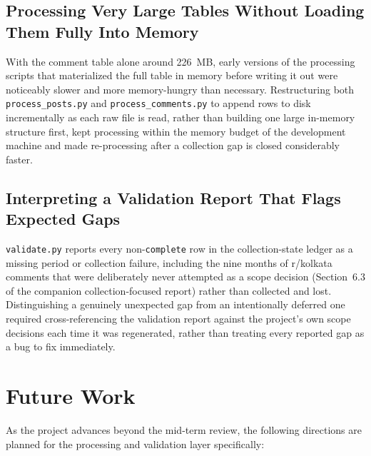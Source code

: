 \documentclass[12pt]{article}
\begin{document}
\subsection{Processing Very Large Tables Without Loading Them Fully Into Memory}
With the comment table alone around 226~MB, early versions of the processing scripts that
materialized the full table in memory before writing it out were noticeably slower and more
memory-hungry than necessary. Restructuring both \texttt{process\_posts.py} and
\texttt{process\_comments.py} to append rows to disk incrementally as each raw file is read,
rather than building one large in-memory structure first, kept processing within the memory
budget of the development machine and made re-processing after a collection gap is closed
considerably faster.

\subsection{Interpreting a Validation Report That Flags Expected Gaps}
\texttt{validate.py} reports every non-\texttt{complete} row in the collection-state ledger as a
missing period or collection failure, including the nine months of r/kolkata comments that were
deliberately never attempted as a scope decision (Section~6.3 of the companion collection-focused
report) rather than collected and lost. Distinguishing a genuinely unexpected gap from an
intentionally deferred one required cross-referencing the validation report against the project's
own scope decisions each time it was regenerated, rather than treating every reported gap as a
bug to fix immediately.


\section{Future Work}

As the project advances beyond the mid-term review, the following directions are planned for the
processing and validation layer specifically:
\end{document}
